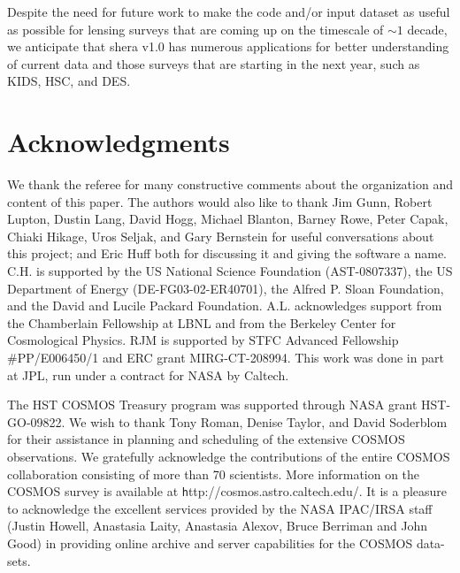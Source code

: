 \documentclass[twocolumn,useAMS,usenatbib]{mn2e}
\newcommand{\newtext}{}
\begin{document}
Despite the need for future work to make the code and/or input dataset
as useful as possible for lensing surveys that are coming up on the
timescale of $\sim 1$ decade, we anticipate that {\sc shera v1.0} has
numerous applications for better understanding of current data and
those surveys that are starting in the next year, such as KIDS, HSC,
and DES.

\section*{Acknowledgments}

We thank the referee for many constructive comments about
the organization and content of this paper.  The authors would also like to thank Jim Gunn, Robert Lupton, Dustin Lang,
David Hogg, Michael Blanton, Barney Rowe, Peter Capak,
Chiaki Hikage, Uros Seljak, and Gary Bernstein for useful
conversations about this project; and Eric Huff both for discussing it
and giving the
software a name.     
C.H. is supported by the US National Science Foundation (AST-0807337),
the US Department of Energy (DE-FG03-02-ER40701), the Alfred P. Sloan
Foundation, and the David and Lucile Packard Foundation.
A.L. acknowledges support from the Chamberlain Fellowship at LBNL and
from the Berkeley Center for Cosmological Physics.  RJM is supported
by STFC Advanced Fellowship \#PP/E006450/1 and ERC grant
MIRG-CT-208994.  This work was done in part at JPL, run under a
contract for NASA by Caltech. 

\newtext{The HST
COSMOS Treasury program was supported through NASA grant
HST-GO-09822. We wish to thank Tony Roman, Denise Taylor, and David
Soderblom for their assistance in planning and scheduling of the
extensive COSMOS observations.  We gratefully acknowledge the
contributions of the entire COSMOS collaboration consisting of more
than 70 scientists.  More information on the COSMOS survey is
available at {\texttt http://cosmos.astro.caltech.edu/}. It is a pleasure to
acknowledge the excellent services provided by the NASA IPAC/IRSA
staff (Justin Howell, Anastasia Laity, Anastasia Alexov, Bruce
Berriman and John Good) in providing online archive and server
capabilities for the COSMOS data-sets.}
\end{document}
